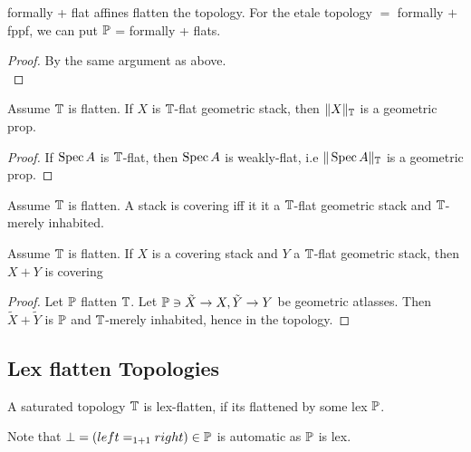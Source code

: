 \begin{example}
	 formally \etale + flat affines flatten the \etale topology.
	For the etale topology $=$ formally \etale $+$ fppf, we can put $\mathbb{P}$ = formally \etale + flats. %
\end{example}
\begin{proof}
	By the same argument as above. \\
\end{proof}

\begin{lemma}{\label{lemma:TruncOfP}}
	Assume $\mathbb{T}$ is flatten.
	If $X$ is $\mathbb{T}$-flat geometric stack, then $\|X\|_{\mathbb{T}}$ is a geometric prop.
\end{lemma}
\begin{proof}
	
	If $\operatorname{Spec} A$ is $\mathbb{T}$-flat, then $\operatorname{Spec} A$ is weakly-flat, i.e $\| \operatorname{Spec} A\|_{\mathbb{T}}$ is a geometric prop.
\end{proof}
\begin{lemma}{\label{lemma:detectCovering}}
	Assume $\mathbb{T}$ is flatten.
	A stack is covering iff it it a $\mathbb{T}$-flat geometric stack and $\mathbb{T}$-merely inhabited.
\end{lemma}

\begin{lemma}
	Assume $\mathbb{T}$ is flatten.
	If $X$ is a covering stack and $Y$ a $\mathbb{T}$-flat geometric stack, then $X + Y$ is covering
\end{lemma}
\begin{proof}
	Let $\mathbb{P}$ flatten $\mathbb{T}$.
	Let ${\mathbb{P}} \ni \tilde X \to X, \tilde Y \to Y$ be geometric atlasses. Then $\tilde X+ \tilde Y$ is $\mathbb{P}$ and ${\mathbb{T}}$-merely inhabited, hence in the topology.
\end{proof}

\subsection{Lex flatten Topologies}


\begin{definition}
	A saturated topology $\mathbb{T}$ is lex-flatten, if its flattened by some lex $\mathbb{P}$. %
\end{definition}
Note that $\bot = (left =_{1+1} right) \in \mathbb{P}$ is automatic as $\mathbb{P}$ is lex.


